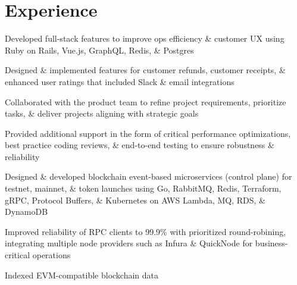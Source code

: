 \documentclass[]{resume}
\begin{document}
\hspace{10pt}
\begin{minipage}[t]{0.55\textwidth} 


\section{Experience}

\smallbreak
\smallbreak
\smallbreak
\begin{tightemize}
\item Developed full-stack features to improve ops efficiency \& customer UX using Ruby on Rails, Vue.js, GraphQL, Redis, \& Postgres
\item Designed \& implemented features for customer refunds, customer receipts, \& enhanced user ratings that included Slack \& email integrations
\item Collaborated with the product team to refine project requirements, prioritize tasks, \& deliver projects aligning with strategic goals
\item Provided additional support in the form of critical performance optimizations, best practice coding reviews, \& end-to-end testing to ensure robustness \& reliability
\end{tightemize}
\sectionsep 


\begin{tightemize}
\item Designed \& developed blockchain event-based microservices (control plane) for testnet, mainnet, \& token launches using Go, RabbitMQ, Redis, Terraform, gRPC, Protocol Buffers, \& Kubernetes on AWS Lambda, MQ, RDS, \& DynamoDB
\item Improved reliability of RPC clients to 99.9\% with prioritized round-robining, integrating multiple node providers such as Infura \& QuickNode for business-critical operations
\item Indexed EVM-compatible blockchain data
\end{tightemize}
\sectionsep 


\end{minipage}
\end{document}
